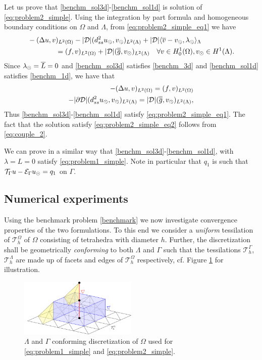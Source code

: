 Let us prove that \eqref{benchm_sol3d}-\eqref{benchm_sol1d} is solution of
\eqref{eq:problem2_simple}. Using the integration by part formula and homogeneous
boundary conditions on $\Omega$ and $\Lambda$, from \eqref{eq:problem2_simple_eq1} we have
\begin{align*}
&-(\Delta u, v)_{L^2(\Omega)} - |{\cal D}|(d^2_{ss} \ud, \vd)_{L^2(\Lambda)} 
+ |{\cal D}|\langle \avrc{v}  - \vd, \ld \rangle_\Lambda
\\
\nonumber
&\qquad\qquad= (f,v)_{L^2(\Omega)} + |{\cal D}| (\avrd{g},\vd)_{L^2(\Lambda)}
\quad \forall v \in H^1_0(\Omega), \vd \in H^1(\Lambda).
\\
\end{align*}
Since $\lambda_{\odot}=\overline{L}=0$ and \eqref{benchm_sol3d} satisfies \eqref{benchm_3d} and \eqref{benchm_sol1d}
satisfies \eqref{benchm_1d}, we have that
\begin{align*}
-(\Delta u, v)_{L^2(\Omega)} =  (f,v)_{L^2(\Omega)} \\
-|{\partial \cal D}|(d^2_{ss} \ud, \vd)_{L^2(\Lambda)}  = |{\cal D}| (\avrd{g},\vd)_{L^2(\Lambda)},
\end{align*}
Thus \eqref{benchm_sol3d}-\eqref{benchm_sol1d} satisfy \eqref{eq:problem2_simple_eq1}.
The fact that the solution satisfy \eqref{eq:problem2_simple_eq2} follows from \eqref{eq:couple_2}.

We can prove in a similar way that \eqref{benchm_sol3d}-\eqref{benchm_sol1d}, with $\lambda=L=0$
satisfy \eqref{eq:problem1_simple}. Note in particular that $q_1$ is such that
${\mathcal{T}_\Gamma}{u} - \mathcal{E}_\Gamma{u_{\odot}} = q_1$ on $\Gamma$.

\subsection{Numerical experiments} Using the benchmark problem \eqref{benchmark}
we now investigate convergence properties of the two formulations. To this
end we consider a \emph{uniform} tessilation of $\mathcal{T}^{\Omega}_h$ of $\Omega$ consisting of
tetrahedra with diameter $h$. Further, the discretization shall be
geometrically \emph{conforming} to both $\Lambda$ and $\Gamma$ such that
the tessilations $\mathcal{T}^{\Gamma}_h$, $\mathcal{T}^{\Lambda}_h$ are made up
of facets and edges of $\mathcal{T}^{\Omega}_h$ respectively, cf. Figure \ref{fig:mesh}
for illustration.

\begin{figure}
  \begin{center}
    \includegraphics[width=0.5\textwidth]{./graphics/conform_mesh.pdf}
    \caption{$\Lambda$ and $\Gamma$ conforming discretization of $\Omega$
      used for \eqref{eq:problem1_simple} and \eqref{eq:problem2_simple}.
    }
    \label{fig:mesh}
  \end{center}
\end{figure}
  
